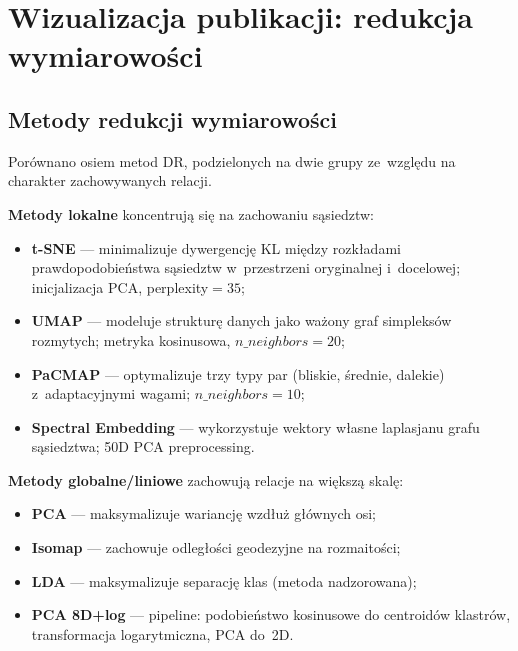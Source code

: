 \documentclass[a4paper,11pt,twocolumn]{article}
\begin{document}
\section{Wizualizacja publikacji: redukcja wymiarowości}
\label{sec:dr}

\subsection{Metody redukcji wymiarowości}


Porównano osiem metod DR, podzielonych na dwie grupy ze~względu na
charakter zachowywanych relacji.


\textbf{Metody lokalne} koncentrują się na zachowaniu sąsiedztw:
\begin{itemize}
  \item \textbf{t-SNE} --- minimalizuje dywergencję KL między rozkładami
        prawdopodobieństwa sąsiedztw w~przestrzeni oryginalnej i~docelowej;
        inicjalizacja PCA, perplexity$=35$;
  \item \textbf{UMAP} --- modeluje strukturę danych jako ważony graf
        simpleksów rozmytych; metryka kosinusowa, $n\_neighbors=20$;
  \item \textbf{PaCMAP} --- optymalizuje trzy typy par (bliskie, średnie,
        dalekie) z~adaptacyjnymi wagami; $n\_neighbors=10$;
  \item \textbf{Spectral Embedding} --- wykorzystuje wektory własne
        laplasjanu grafu sąsiedztwa; 50D PCA preprocessing.
\end{itemize}

\textbf{Metody globalne/liniowe} zachowują relacje na większą skalę:
\begin{itemize}
  \item \textbf{PCA} --- maksymalizuje wariancję wzdłuż głównych osi;
  \item \textbf{Isomap} --- zachowuje odległości geodezyjne na rozmaitości;
  \item \textbf{LDA} --- maksymalizuje separację klas (metoda nadzorowana);
  \item \textbf{PCA 8D+log} --- pipeline: podobieństwo kosinusowe do
        centroidów klastrów, transformacja logarytmiczna, PCA do~2D.
\end{itemize}
\end{document}
